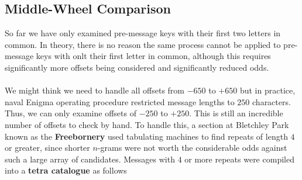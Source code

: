   \subsection{Middle-Wheel Comparison}
  So far we have only examined pre-message keys with their first two
  letters in common. In theory, there is no reason the same process
  cannot be applied to pre-message keys with onlt their first letter in
  common, although this requires significantly more offsets being
  considered and significantly reduced odds.
  \\\\We might think we need to handle all offsets from $-650$ to
  $+650$ but in practice, naval Enigma operating procedure restricted
  message lengths to $250$ characters. Thus, we can only examine
  offsets of $-250$ to $+250$. This is still an incredible number of
  offsets to check by hand. To handle this, a section at Bletchley
  Park known as the {\bf{Freebornery}} used tabulating machines to
  find repeats of length $4$ or greater, since shorter $n$-grams were
  not worth the considerable odds against such a large array of
  candidates. Messages with $4$ or more repeats were compiled into a
  {\bf{tetra catalogue}} as follows

